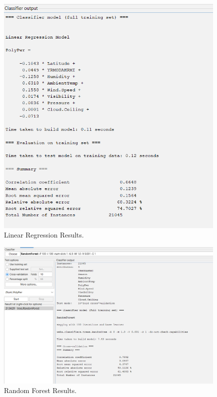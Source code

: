 \documentclass[10pt,twocolumn]{article}
\begin{document}
\begin{figure}
            \centering
            \includegraphics[width=1\linewidth]{LinReg.png}
            \caption{Linear Regression Results.}
            \label{fig:enter-label}
        \end{figure}
         
    
    \label{Figure 1}

\begin{figure}
    \centering
    \includegraphics[width=1\linewidth]{Randomforest.png}
    \caption{ Random Forest Results.}
    \label{Figure 2}
\end{figure}
\end{document}
